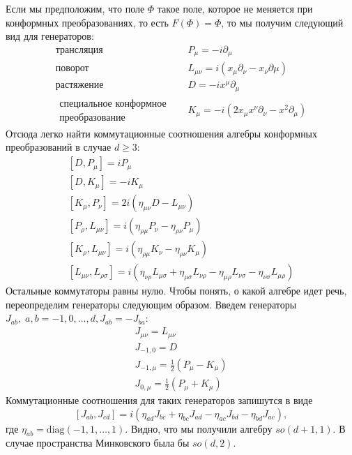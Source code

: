 \documentclass[a4paper,12pt]{article} \usepackage[utf8x]{inputenc} \usepackage[russian]{babel}
\theoremstyle{definition} \newtheorem{corollary}{Corollary}[theorem] \theoremstyle{definition}
\begin{document}
Если мы предположим, что поле $\Phi$ такое поле, которое не меняется при конформных преобразованиях,
то есть $F(\Phi)=\Phi$, то мы получим следующий вид для генераторов:
\begin{eqnarray}
  \label{eq:169} \mbox{трансляция} & \quad P_{\mu}=-i\partial_{\mu}\\ \mbox{поворот} & \quad
L_{\mu\nu}=i(x_{\mu}\partial_{\nu}-x_{\nu}\partial{\mu})\\ \mbox{растяжение}& \quad
D=-ix^{\mu}\partial_{\mu}\\
  \begin{array}{r} \mbox{специальное конформное} \\ \mbox{преобразование}
  \end{array} & \quad K_{\mu}=-i(2x_{\mu}x^{\nu}\partial_{\nu}-x^2\partial_{\mu})
\end{eqnarray} Отсюда легко найти коммутационные соотношения алгебры конформных преобразований в
случае $d\geq 3$:
\begin{eqnarray}
  \label{eq:170} \left[D,P_{\mu}\right]=i P_{\mu}\\ \left[D,K_{\mu}\right]=-i K_{\mu}\\
\left[K_{\mu},P_{\nu}\right]=2i (\eta_{\mu\nu}D - L_{\mu\nu})\\
\left[P_{\rho},L_{\mu\nu}\right]=i(\eta_{\rho\mu}P_{\nu}-\eta_{\rho\nu}P_{\mu})\\
\left[K_{\rho},L_{\mu\nu}\right]=i(\eta_{\rho\mu}K_{\nu}-\eta_{\rho\nu}K_{\mu})\\
\left[L_{\mu\nu},L_{\rho\sigma}\right]=i(\eta_{\nu\rho}L_{\mu\sigma}+\eta_{\mu\sigma}L_{\nu\rho}-\eta_{\mu\rho}L_{\nu\sigma}-\eta_{\nu\sigma}L_{\mu\rho})
\end{eqnarray} Остальные коммутаторы равны нулю. Чтобы понять, о какой алгебре идет речь,
переопределим генераторы следующим образом. Введем генераторы $J_{ab}, \; a,b=-1,0,\dots,d,
J_{ab}=-J_{ba}$:
\begin{eqnarray}
  \label{eq:171} J_{\mu\nu}=L_{\mu\nu}\\ J_{-1,0}=D\\ J_{-1,\mu}=\frac{1}{2}(P_{\mu}-K_{\mu})\\
J_{0,\mu}=\frac{1}{2}(P_{\mu}+K_{\mu})
\end{eqnarray} Коммутационные соотношения для таких генераторов запишутся в виде
\begin{equation}
  \label{eq:172}
\left[J_{ab},J_{cd}\right]=i(\eta_{ad}J_{bc}+\eta_{bc}J_{ad}-\eta_{ac}J_{bd}-\eta_{bd}J_{ac}),
\end{equation} где $\eta_{ab}=\mathrm{diag}(-1,1,\dots,1)$. Видно, что мы получили алгебру
$so(d+1,1)$. В случае пространства Минковского была бы $so(d,2)$.
\end{document}
